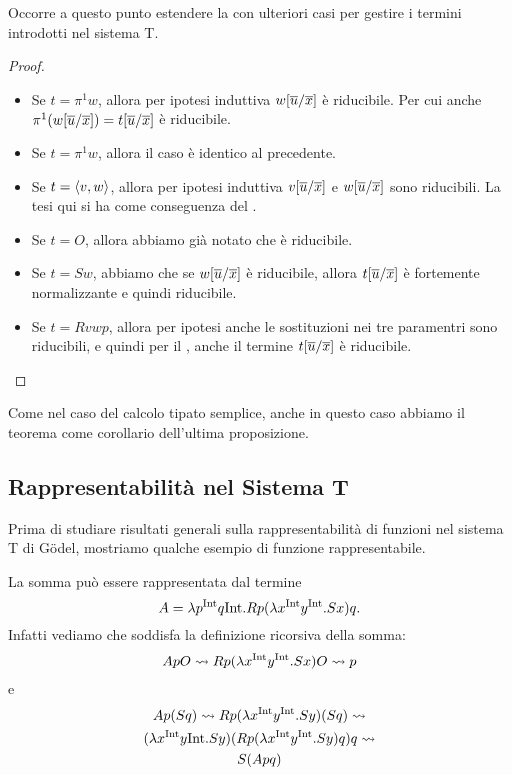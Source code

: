 \documentclass[]{marticle}
\begin{document}
Occorre a questo punto estendere la  con ulteriori casi per
gestire i termini introdotti nel sistema T.

\begin{proof}
    \begin{itemize}
        \item Se $t = \pi^1 w$, allora per ipotesi induttiva
            $w[\overline{u}/\overline{x}]$ \`e riducibile. Per cui anche 
            $\pi^1 (w[\overline{u}/\overline{x}]) = t [\overline{u}/\overline{x}]$ \`e riducibile.
        \item Se $t = \pi^1 w$, allora il caso \`e identico al precedente.
        \item Se $t = \langle v,w \rangle$, allora per ipotesi induttiva
            $v[\overline{u}/\overline{x}]$ e $w[\overline{u}/\overline{x}]$ sono riducibili. La tesi qui si ha come conseguenza
            del .
        \item Se $t=O$, allora abbiamo gi\`a notato che \`e riducibile.
        \item Se $t = Sw$, abbiamo che se $w[\overline{u}/\overline{x}]$
            \`e riducibile, allora $t[\overline{u}/\overline{x}]$ \`e
            fortemente normalizzante e quindi riducibile.
        \item Se $t = Rvwp$, allora per ipotesi anche le sostituzioni nei tre
            paramentri sono riducibili, e quindi per il , anche il
            termine $t[\overline{u}/\overline{x}]$ \`e riducibile.
    \end{itemize}
\end{proof}

Come nel caso del calcolo tipato semplice, anche in questo caso abbiamo il
teorema come corollario dell'ultima proposizione.

\subsection{Rappresentabilit\`a nel Sistema T}

Prima di studiare risultati generali sulla rappresentabilit\`a di funzioni nel
sistema T di G\"odel, mostriamo qualche esempio di funzione rappresentabile.

La somma pu\`o essere rappresentata dal termine
\[
    A = \lambda p^{\text{Int}} q\text{Int}. Rp (\lambda x^{\text{Int}} y^{\text{Int}}. Sx) q.
\]
Infatti vediamo che soddisfa la definizione ricorsiva della somma:
\begin{gather*}
    ApO \rightsquigarrow R p (\lambda x^{\text{Int}} y^{\text{Int}}. Sx) O \rightsquigarrow p
\end{gather*}
e 
\begin{gather*}
    Ap(Sq) \rightsquigarrow R p (\lambda x^{\text{Int}} y^{\text{Int}}. Sy) (Sq) \rightsquigarrow \\ (\lambda x^{\text{Int}} y\text{Int}. Sy)(R p (\lambda x^{\text{Int}} y^{\text{Int}}. Sy) q) q \rightsquigarrow \\
    S (A pq)
\end{gather*}
\end{document}
